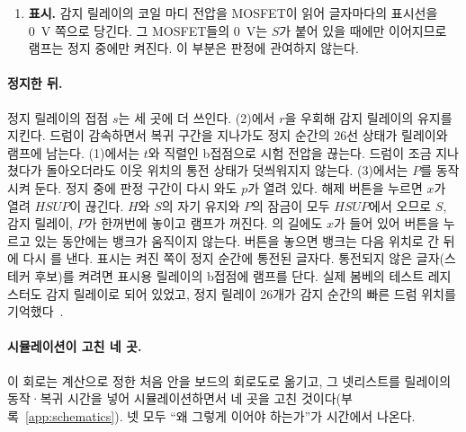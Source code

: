 \begin{enumerate}
신호다. 릴레이 $T$, $J$, $R$이 이것을 받아 접점 $t$, $j$, $r$로 바꾼다. 커넥터의 핀과 코일 사이에는 다이오드가
하나씩 있다. 이 코일들은 빨리 놓이도록 다이오드와 제너를 단 클램프로 역기전력을 받는데, 핀과 코일이 바로 이어져
있으면 신호를 끄는 순간 핀이 약 $-31$~V까지 끌려 내려가 신호를 내는 뱅크 쪽 부품(광센서의 출력이나 구동 소자)이
견디지 못한다. 직렬 다이오드가 그 순간 막혀 코일의 전류는 보드 안의 클램프로만 돌고 핀은 0~V에 머문다(결정 0003).
앞면의 해제 버튼은 해제 릴레이 $X$를 구동한다.
\item \textbf{표시.} 감지 릴레이의 코일 마디 전압을 MOSFET이 읽어 글자마다의 표시선을 0~V 쪽으로 당긴다. 그
MOSFET들의 0~V는 $S$가 붙어 있을 때에만 이어지므로 램프는 정지 중에만 켜진다. 이 부분은 판정에 관여하지 않는다.
\end{enumerate}

\paragraph{정지한 뒤.} 정지 릴레이의 접점 $s$는 세 곳에 더 쓰인다. (2)에서 $r$을 우회해 감지 릴레이의
유지를 지킨다. 드럼이 감속하면서 복귀 구간을 지나가도 정지 순간의 26선 상태가 릴레이와 램프에 남는다.
(1)에서는 $t$와 직렬인 b접점으로 시험 전압을 끊는다. 드럼이 조금 지나쳤다가 돌아오더라도 이웃
위치의 통전 상태가 덧씌워지지 않는다. (3)에서는 $P$를 동작시켜 둔다. 정지 중에 판정 구간이 다시 와도 $p$가
열려 있다. 해제 버튼을 누르면 $x$가 열려 $HSUP$이 끊긴다. $H$와 $S$의 자기 유지와 $P$의 잠금이 모두 $HSUP$에서
오므로 $S$, 감지 릴레이, $P$가 한꺼번에 놓이고 램프가 꺼진다. 의 길에도 $x$가 들어 있어 버튼을 누르고
있는 동안에는 뱅크가 움직이지 않는다. 버튼을 놓으면 뱅크는 다음 위치로 간 뒤에 다시 를 낸다.
표시는 켜진 쪽이 정지 순간에 통전된 글자다. 통전되지 않은 글자(스테커 후보)를 켜려면 표시용 릴레이의 b접점에
램프를 단다. 실제 봄베의 테스트 레지스터도 감지 릴레이로 되어 있었고, 정지 릴레이 26개가 감지 순간의 빠른 드럼
위치를 기억했다~\cite{us6812report1944,jackson-bh10}.

\paragraph{시뮬레이션이 고친 네 곳.} 이 회로는 계산으로 정한 처음 안을 보드의 회로도로 옮기고, 그 넷리스트를
릴레이의 동작·복귀 시간을 넣어 시뮬레이션하면서 네 곳을 고친 것이다(부록~\ref{app:schematics}). 넷 모두 ``왜
그렇게 이어야 하는가''가 시간에서 나온다.

